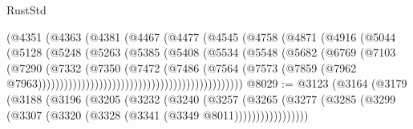\begin{lexlean}{RustStd}
\begin{coremodule}
                                        (@4351
                                          (@4363
                                            (@4381
                                              (@4467
                                                (@4477
                                                  (@4545
                                                    (@4758
                                                      (@4871
                                                        (@4916
                                                          (@5044
                                                            (@5128
                                                              (@5248
                                                                (@5263
                                                                  (@5385
                                                                    (@5408
                                                                      (@5534
                                                                        (@5548
                                                                          (@5682
                                                                            (@6769
                                                                              (@7103
                                                                                (@7290
                                                                                  (@7332
                                                                                    (@7350
                                                                                      (@7472
                                                                                        (@7486
                                                                                          (@7564
                                                                                            (@7573
                                                                                              (@7859
                                                                                                (@7962
                                                                                                  @7963)))))))))))))))))))))))))))))))))))))))))))))))
@8029 := @3123
    (@3164
      (@3179
        (@3188
          (@3196
            (@3205
              (@3232
                (@3240
                  (@3257
                    (@3265
                      (@3277 (@3285 (@3299 (@3307 (@3320 (@3328 (@3341 (@3349 @8011)))))))))))))))))

\end{coremodule}
\end{lexlean}

